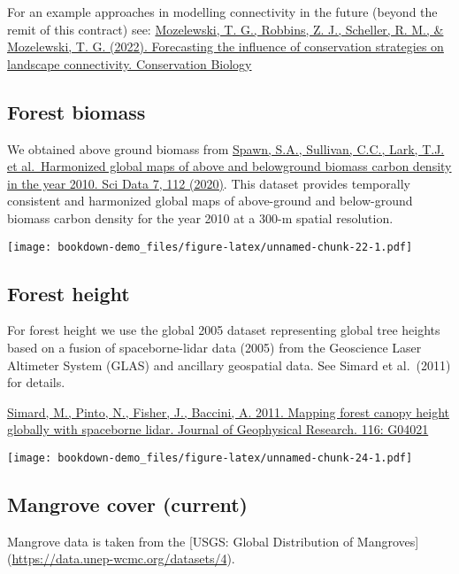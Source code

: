 \documentclass[
]{book}
\begin{document}
For an example approaches in modelling connectivity in the future (beyond the remit of this contract) see: \href{https://conbio.onlinelibrary.wiley.com/doi/epdf/10.1111/cobi.13904}{Mozelewski, T. G., Robbins, Z. J., Scheller, R. M., \& Mozelewski, T. G. (2022). Forecasting the influence of conservation strategies on landscape connectivity. Conservation Biology}

\hypertarget{forest-biomass}{%
\subsection{Forest biomass}\label{forest-biomass}}

We obtained above ground biomass from \href{https://doi.org/10.1038/s41597-020-0444-4}{Spawn, S.A., Sullivan, C.C., Lark, T.J. et al.~Harmonized global maps of above and belowground biomass carbon density in the year 2010. Sci Data 7, 112 (2020)}. This dataset provides temporally consistent and harmonized global maps of above-ground and below-ground biomass carbon density for the year 2010 at a 300-m spatial resolution.

\texttt{[image: bookdown-demo\_files/figure-latex/unnamed-chunk-22-1.pdf]}

\hypertarget{forest-height}{%
\subsection{Forest height}\label{forest-height}}

For forest height we use the global 2005 dataset representing global tree heights based on a fusion of spaceborne-lidar data (2005) from the Geoscience Laser Altimeter System (GLAS) and ancillary geospatial data. See Simard et al.~(2011) for details.

\href{https://agupubs.onlinelibrary.wiley.com/doi/10.1029/2011JG001708}{Simard, M., Pinto, N., Fisher, J., Baccini, A. 2011. Mapping forest canopy height globally with spaceborne lidar. Journal of Geophysical Research. 116: G04021}

\texttt{[image: bookdown-demo\_files/figure-latex/unnamed-chunk-24-1.pdf]}

\hypertarget{mangrove-cover-current}{%
\subsection{Mangrove cover (current)}\label{mangrove-cover-current}}

Mangrove data is taken from the {[}USGS: Global Distribution of Mangroves{]} (\url{https://data.unep-wcmc.org/datasets/4}).
\end{document}
